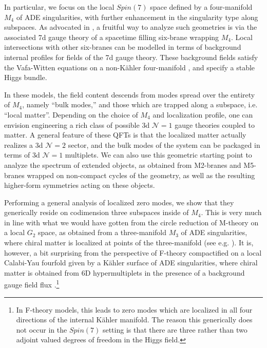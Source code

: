 \documentclass[12pt]{article}%
\numberwithin{equation}{section}
\renewcommand{\(}{\left(}
\renewcommand{\)}{\right)}
\renewcommand{\[}{\left[}
\renewcommand{\]}{\right]}
\begin{document}
In particular, we focus on the local $Spin(7)$ space
defined by a four-manifold $M_4$ of ADE singularities, with further enhancement in the singularity type
along subspaces. As advocated in \cite{Heckman:2018mxl}, a fruitful way to analyze such geometries is via the
associated 7d gauge theory of a spacetime filling six-brane wrapping $M_4$. Local intersections
with other six-branes can be modelled in terms of background internal profiles for fields of the 7d gauge theory.
These background fields satisfy the Vafa-Witten equations on a non-K\"ahler four-manifold \cite{Vafa:1994tf},
and specify a stable Higgs bundle.

In these models, the field content descends from modes spread over the entirety of $M_4$, namely ``bulk modes,'' and
those which are trapped along a subspace, i.e. ``local matter''. Depending on the choice of $M_4$
and localization profile, one can envision engineering a rich class of possible 3d $\mathcal{N} = 1$
gauge theories coupled to matter. A general feature of these QFTs is that the localized matter actually
realizes a 3d $\mathcal{N} = 2$ sector,
and the bulk modes of the system can be packaged in terms of 3d $\mathcal{N} =1$ multiplets.
We can also use this geometric starting point to analyze the spectrum of extended objects, as obtained
from M2-branes and M5-branes wrapped on non-compact cycles of the geometry, as well as the resulting
higher-form symmetries acting on these objects.

Performing a general analysis of localized zero modes,
we show that they generically reside on codimension three subspaces inside of $M_4$. This is very much in line with what we would have gotten
from the circle reduction of M-theory on a local $G_2$ space, as obtained from a three-manifold $M_3$ of ADE singularities, where chiral matter is localized at points of the three-manifold (see e.g. \cite{Acharya:2001gy, Pantev:2009de, Braun:2018vhk, Barbosa:2019bgh}). It is, however, a bit surprising from the perspective of F-theory compactified on a local Calabi-Yau fourfold given by a K\"ahler surface of ADE singularities, where chiral matter is obtained from 6D hypermultiplets in the presence of a background gauge field
flux \cite{Donagi:2008ca, Beasley:2008dc}.\footnote{In F-theory models, this leads to zero modes which are localized in all four directions of the internal K\"ahler manifold. The reason this generically does not occur in the $Spin(7)$ setting is that there are three rather than two adjoint valued degrees of freedom in the Higgs field.}
\end{document}
